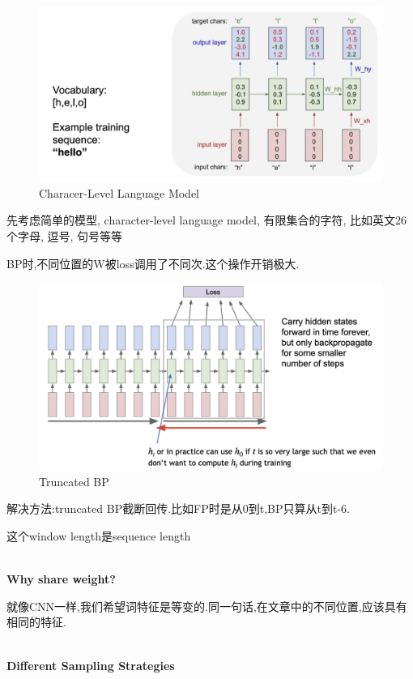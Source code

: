 	\begin{figure}[htbp]
		\centering
		\includegraphics[scale=0.2]{figures/word_model.png}
		\caption{Characer-Level Language Model}
	\end{figure}

	先考虑简单的模型, character-level language model, 有限集合的字符, 
	比如英文26个字母, 逗号, 句号等等

	BP时,不同位置的W被loss调用了不同次.这个操作开销极大.

	\begin{figure}[htbp]
		\centering
		\includegraphics[scale=0.2]{figures/truncate_bp.png}
		\caption{Truncated BP}
	\end{figure}
	
	解决方法:truncated BP截断回传.比如FP时是从0到t,BP只算从t到t-6.

	这个window length是sequence length

	\textbf{\\Why share weight?} 
	
	就像CNN一样,我们希望词特征是等变的.同一句话,在文章中的不同位置,应该具有相同的特征.

	\textbf{\\Different Sampling Strategies}

